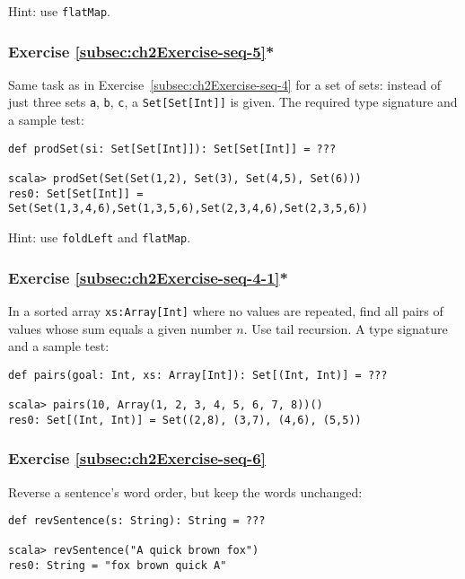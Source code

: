 Hint: use \lstinline!flatMap!.

\subsubsection{Exercise \label{subsec:ch2Exercise-seq-5}\ref{subsec:ch2Exercise-seq-5}{*}}

Same task as in Exercise~\ref{subsec:ch2Exercise-seq-4} for a set
of sets: instead of just three sets \lstinline!a!, \lstinline!b!,
\lstinline!c!, a \lstinline!Set[Set[Int]]! is given. The required
type signature and a sample test:
\begin{lstlisting}
def prodSet(si: Set[Set[Int]]): Set[Set[Int]] = ???

scala> prodSet(Set(Set(1,2), Set(3), Set(4,5), Set(6)))
res0: Set[Set[Int]] = Set(Set(1,3,4,6),Set(1,3,5,6),Set(2,3,4,6),Set(2,3,5,6))
\end{lstlisting}

Hint: use \lstinline!foldLeft! and \lstinline!flatMap!.

\subsubsection{Exercise \label{subsec:ch2Exercise-seq-4-1}\ref{subsec:ch2Exercise-seq-4-1}{*}}

In a sorted array \lstinline!xs:Array[Int]! where no values are repeated,
find all pairs of values whose sum equals a given number $n$. Use
tail recursion. A type signature and a sample test:
\begin{lstlisting}
def pairs(goal: Int, xs: Array[Int]): Set[(Int, Int)] = ???

scala> pairs(10, Array(1, 2, 3, 4, 5, 6, 7, 8))()
res0: Set[(Int, Int)] = Set((2,8), (3,7), (4,6), (5,5))
\end{lstlisting}


\subsubsection{Exercise \label{subsec:ch2Exercise-seq-6}\ref{subsec:ch2Exercise-seq-6}}

Reverse a sentence\textsf{'}s word order, but keep the words unchanged:
\begin{lstlisting}
def revSentence(s: String): String = ???

scala> revSentence("A quick brown fox")
res0: String = "fox brown quick A"
\end{lstlisting}


